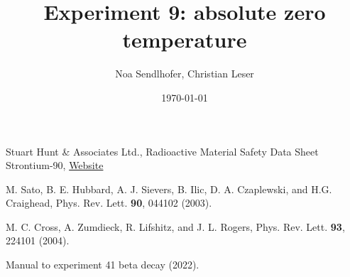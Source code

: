\documentclass[12pt,a4paper]{article}
\title{Experiment 9: absolute zero temperature}
\author{Noa Sendlhofer, Christian Leser}
\date{\today}
\begin{document}
\maketitle

\begin{abstract}
    
\end{abstract}

\tableofcontents














\begin{thebibliography}{99}

Stuart Hunt \& Associates Ltd., Radioactive Material Safety Data Sheet Strontium-90, \href{https://www.stuarthunt.com/de/cache/modules_elements/103/Strontium-90-Sealed.pdf}{Website}

M. Sato, B. E. Hubbard, A. J. Sievers, B. Ilic, D. A. Czaplewski, and H.G. Craighead, Phys. Rev. Lett. \textbf{90}, 044102 (2003).

M. C. Cross, A. Zumdieck, R. Lifshitz, and J. L. Rogers, Phys. Rev. Lett. \textbf{93}, 224101 (2004).

Manual to experiment 41 beta decay (2022).


\end{thebibliography}
\end{document}
